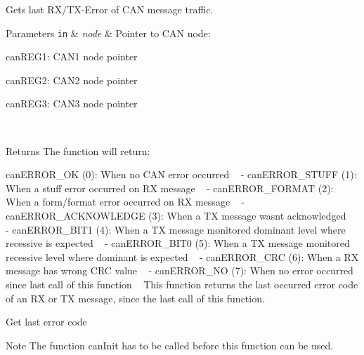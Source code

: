 Gets last R\+X/\+T\+X-\/\+Error of C\+AN message traffic. 


\begin{DoxyParams}[1]{Parameters}
\mbox{\tt in}  & {\em node} & Pointer to C\+AN node\+:
\begin{DoxyItemize}
\item can\+R\+E\+G1\+: C\+A\+N1 node pointer
\item can\+R\+E\+G2\+: C\+A\+N2 node pointer
\item can\+R\+E\+G3\+: C\+A\+N3 node pointer 
\end{DoxyItemize}\\
\hline
\end{DoxyParams}
\begin{DoxyReturn}{Returns}
The function will return\+:
\begin{DoxyItemize}
\item can\+E\+R\+R\+O\+R\+\_\+\+OK (0)\+: When no C\+AN error occurred ~\newline
 -\/ can\+E\+R\+R\+O\+R\+\_\+\+S\+T\+U\+FF (1)\+: When a stuff error occurred on RX message ~\newline
 -\/ can\+E\+R\+R\+O\+R\+\_\+\+F\+O\+R\+M\+AT (2)\+: When a form/format error occurred on RX message ~\newline
 -\/ can\+E\+R\+R\+O\+R\+\_\+\+A\+C\+K\+N\+O\+W\+L\+E\+D\+GE (3)\+: When a TX message wasn\textquotesingle{}t acknowledged ~\newline
 -\/ can\+E\+R\+R\+O\+R\+\_\+\+B\+I\+T1 (4)\+: When a TX message monitored dominant level where recessive is expected ~\newline
 -\/ can\+E\+R\+R\+O\+R\+\_\+\+B\+I\+T0 (5)\+: When a TX message monitored recessive level where dominant is expected ~\newline
 -\/ can\+E\+R\+R\+O\+R\+\_\+\+C\+RC (6)\+: When a RX message has wrong C\+RC value ~\newline
 -\/ can\+E\+R\+R\+O\+R\+\_\+\+NO (7)\+: When no error occurred since last call of this function ~\newline
 This function returns the last occurred error code of an RX or TX message, since the last call of this function. 
\end{DoxyItemize}
\end{DoxyReturn}

\begin{DoxyItemize}
\item Get last error code ~\newline
 \begin{DoxyNote}{Note}
The function can\+Init has to be called before this function can be used. 
\end{DoxyNote}

\end{DoxyItemize}

